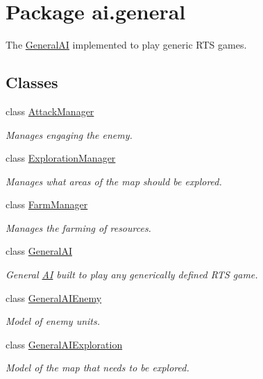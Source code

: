\hypertarget{namespaceai_1_1general}{
\section{Package ai.general}
\label{namespaceai_1_1general}
}


The \hyperlink{classai_1_1general_1_1_general_a_i}{GeneralAI} implemented to play generic RTS games.  


\subsection*{Classes}
\begin{DoxyCompactItemize}
\item 
class \hyperlink{classai_1_1general_1_1_attack_manager}{AttackManager}
\begin{DoxyCompactList}\small\item\em Manages engaging the enemy. \end{DoxyCompactList}\item 
class \hyperlink{classai_1_1general_1_1_exploration_manager}{ExplorationManager}
\begin{DoxyCompactList}\small\item\em Manages what areas of the map should be explored. \end{DoxyCompactList}\item 
class \hyperlink{classai_1_1general_1_1_farm_manager}{FarmManager}
\begin{DoxyCompactList}\small\item\em Manages the farming of resources. \end{DoxyCompactList}\item 
class \hyperlink{classai_1_1general_1_1_general_a_i}{GeneralAI}
\begin{DoxyCompactList}\small\item\em General \hyperlink{classai_1_1_a_i}{AI} built to play any generically defined RTS game. \end{DoxyCompactList}\item 
class \hyperlink{classai_1_1general_1_1_general_a_i_enemy}{GeneralAIEnemy}
\begin{DoxyCompactList}\small\item\em Model of enemy units. \end{DoxyCompactList}\item 
class \hyperlink{classai_1_1general_1_1_general_a_i_exploration}{GeneralAIExploration}
\begin{DoxyCompactList}\small\item\em Model of the map that needs to be explored. \end{DoxyCompactList}\item 

\end{DoxyCompactItemize}
